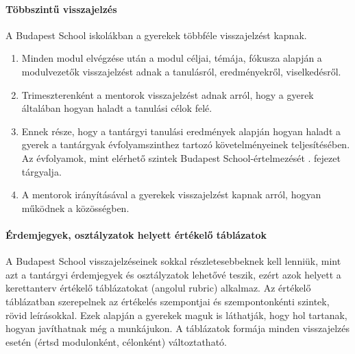 \paragraph{Többszintű visszajelzés} A Budapest School iskolákban a gyerekek
többféle visszajelzést kapnak. \begin{enumerate}
      \item Minden modul elvégzése után a modul céljai, témája, fókusza alapján a modulvezetők visszajelzést adnak a tanulásról, eredményekről, viselkedésről.
      \item Trimeszterenként a mentorok visszajelzést adnak arról, hogy a gyerek általában hogyan haladt a tanulási célok felé.
      \item Ennek része, hogy a tantárgyi tanulási eredmények alapján hogyan haladt a gyerek a tantárgyak évfolyamszinthez tartozó követelményeinek teljesítésében. Az évfolyamok, mint elérhető szintek Budapest School-értelmezését . fejezet tárgyalja.
      \item A mentorok irányításával a gyerekek visszajelzést kapnak arról, hogyan működnek a közösségben.
\end{enumerate}

\paragraph{Érdemjegyek, osztályzatok helyett értékelő táblázatok} A Budapest
School visszajelzéseinek sokkal részletesebbeknek kell lenniük, mint azt a tantárgyi érdemjegyek és osztályzatok lehetővé teszik, ezért azok helyett a kerettanterv értékelő táblázatokat (angolul rubric) alkalmaz. Az értékelő táblázatban szerepelnek az értékelés szempontjai és szempontonkénti szintek, rövid leírásokkal. Ezek alapján a gyerekek maguk is láthatják, hogy hol tartanak, hogyan javíthatnak még a munkájukon. A táblázatok formája minden visszajelzés esetén (értsd modulonként, célonként) változtatható.